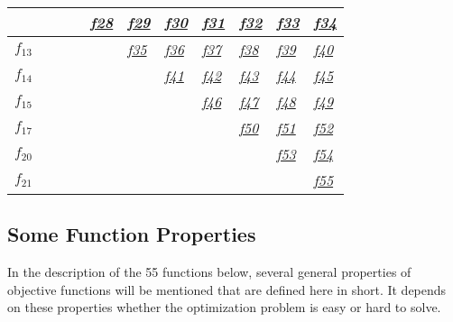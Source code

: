 \documentclass[letterpaper,12pt,english]{article}
\begin{document}
\begin{tabulary}{\linewidth}{|L|L|L|L|L|L|L|L|L|L|L|}
 &  &  &  & 
{\hyperref[index:f28]{\emph{f28}}}
 & 
{\hyperref[index:f29]{\emph{f29}}}
 & 
{\hyperref[index:f30]{\emph{f30}}}
 & 
{\hyperref[index:f31]{\emph{f31}}}
 & 
{\hyperref[index:f32]{\emph{f32}}}
 & 
{\hyperref[index:f33]{\emph{f33}}}
 & 
{\hyperref[index:f34]{\emph{f34}}}
\\
\hline
\href{http://coco.lri.fr/downloads/download15.03/bbobdocfunctions.pdf\#page=65}{\(f_{13}\)}
 &  &  &  &  & 
{\hyperref[index:f35]{\emph{f35}}}
 & 
{\hyperref[index:f36]{\emph{f36}}}
 & 
{\hyperref[index:f37]{\emph{f37}}}
 & 
{\hyperref[index:f38]{\emph{f38}}}
 & 
{\hyperref[index:f39]{\emph{f39}}}
 & 
{\hyperref[index:f40]{\emph{f40}}}
\\
\hline
\href{http://coco.lri.fr/downloads/download15.03/bbobdocfunctions.pdf\#page=70}{\(f_{14}\)}
 &  &  &  &  &  & 
{\hyperref[index:f41]{\emph{f41}}}
 & 
{\hyperref[index:f42]{\emph{f42}}}
 & 
{\hyperref[index:f43]{\emph{f43}}}
 & 
{\hyperref[index:f44]{\emph{f44}}}
 & 
{\hyperref[index:f45]{\emph{f45}}}
\\
\hline
\href{http://coco.lri.fr/downloads/download15.03/bbobdocfunctions.pdf\#page=75}{\(f_{15}\)}
 &  &  &  &  &  &  & 
{\hyperref[index:f46]{\emph{f46}}}
 & 
{\hyperref[index:f47]{\emph{f47}}}
 & 
{\hyperref[index:f48]{\emph{f48}}}
 & 
{\hyperref[index:f49]{\emph{f49}}}
\\
\hline
\href{http://coco.lri.fr/downloads/download15.03/bbobdocfunctions.pdf\#page=85}{\(f_{17}\)}
 &  &  &  &  &  &  &  & 
{\hyperref[index:f50]{\emph{f50}}}
 & 
{\hyperref[index:f51]{\emph{f51}}}
 & 
{\hyperref[index:f52]{\emph{f52}}}
\\
\hline
\href{http://coco.lri.fr/downloads/download15.03/bbobdocfunctions.pdf\#page=100}{\(f_{20}\)}
 &  &  &  &  &  &  &  &  & 
{\hyperref[index:f53]{\emph{f53}}}
 & 
{\hyperref[index:f54]{\emph{f54}}}
\\
\hline
\href{http://coco.lri.fr/downloads/download15.03/bbobdocfunctions.pdf\#page=105}{\(f_{21}\)}
 &  &  &  &  &  &  &  &  &  & 
{\hyperref[index:f55]{\emph{f55}}}
\\
\hline\end{tabulary}



\subsection{Some Function Properties}
\label{index:some-function-properties}
In the description of the 55  functions below, several
general properties of objective functions will be mentioned that
are defined here in short. It depends on these properties whether the optimization problem
is easy or hard to solve.
\end{document}
